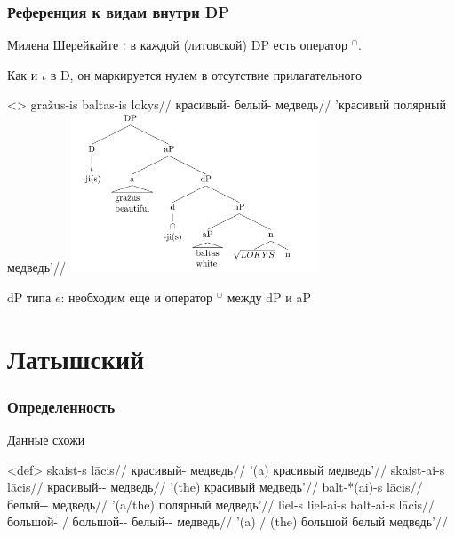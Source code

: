 \documentclass[9pt, t]{beamer}
\begin{document}
\begin{frame}
    \frametitle{Референция к видам внутри DP}

    Милена Шерейкайте \citep{sereikaite2017}: в каждой (литовской) DP есть оператор $^\cap$.

    Как и $\iota$ в D, он маркируется нулем в отсутствие прилагательного

    \ex<>
        \begingl
            \gla gražus-is baltas-is lokys//
            \glb красивый-\Def{} белый-\Def{} медведь//
            \glft 'красивый полярный медведь'//
        \endgl
    \xe
    \includegraphics[width=20em]{sereitree.png}

    \pause
    dP типа $e$: необходим еще и оператор $^\cup$ между dP и aP

\end{frame}

\section{Латышский}
\begin{frame}
    \frametitle{Определенность}

    Данные схожи

    \pex<def>
        \a \begingl
            \gla skaist-s lācis//
            \glb красивый-\Nom{} медведь//
            \glft '(a) красивый медведь'//
        \endgl
        \a \begingl
            \gla skaist-ai-s lācis//
            \glb красивый-\Def{}-\Nom{} медведь//
            \glft '(the) красивый медведь'//
        \endgl
        \a \begingl
            \gla balt-*(ai)-s lācis//
            \glb белый-\Def{}-\Nom{} медведь//
            \glft '(a/the) полярный медведь'//
        \endgl
        \a \begingl
            \gla liel-s \judge{/} liel-ai-s balt-ai-s lācis//
            \glb большой-\Nom{} / большой-\Def-\Nom{} белый-\Def-\Nom{} медведь//
            \glft '(a) / (the) большой белый медведь'//
        \endgl
    \xe

\end{frame}
\end{document}
